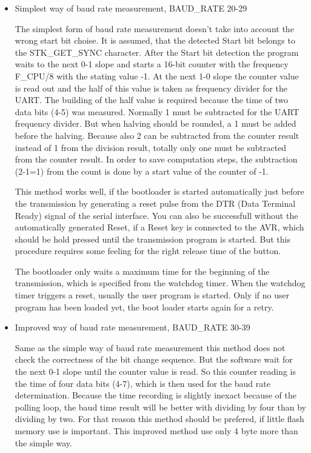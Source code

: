 \begin{itemize}

\item {Simplest way of baud rate measurement, BAUD\_RATE 20-29}

The simplest form of baud rate measurement doesn't take into account
the wrong start bit choise.
It is assumed, that the detected Start bit belongs to the STK\_GET\_SYNC
character.
After the Start bit detection the program waits to the next 0-1 slope
and starts a 16-bit counter with the frequency F\_CPU/8 with the
stating value -1. At the next 1-0 slope the counter value is read out
and the half of this value is taken as frequency divider for the UART.
The building of the half value is required because the time of two data bits (4-5)
was measured.
Normally 1 must be subtracted for the UART frequency divider.
But when halving should be rounded, a 1 must be added before the halving.
Because also 2 can be subtracted from the counter result instead of
1 from the division result, totally only one must be subtracted from the
counter result. In order to save computation steps, the subtraction (2-1=1)
from the count is done by a start value of the counter of -1.

This method works well, if the bootloader is started automatically just
before the transmission by generating a reset pulse from the DTR (Data Terminal Ready)
signal of the serial interface.
You can also be successfull without the automatically generated Reset,
if a Reset key is connected to the AVR, which should be hold pressed
until the transmission program is started.
But this procedure requires some feeling for the right release time
of the button.

The bootloader only waits a maximum time for the beginning of the transmission,
which is specified from the watchdog timer.
When the watchdog timer triggers a reset, usually the user program is started.
Only if no user program has been loaded yet, the boot loader starts again for a retry.

\item {Improved way of baud rate measurement, BAUD\_RATE 30-39}

Same as the simple way of baud rate measurement this method does not
check the correctness of the bit change sequence.
But the software wait for the next 0-1 slope until the counter value
is read.
		So this counter reading is the time of four data bits (4-7),
which is then used for the baud rate determination.
Because the time recording is slightly inexact because of the
polling loop, the baud time result will be better with dividing by four
than by dividing by two.
For that reason this method should be prefered, if little flash memory
use is important. This improved method use only 4 byte more than the
simple way.


\end{itemize}

